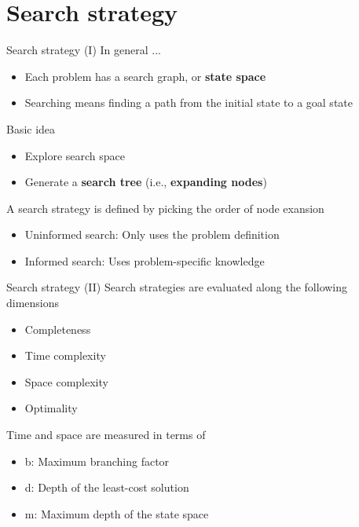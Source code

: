 \documentclass[10pt,compress]{beamer} %
\begin{document}
\section{Search strategy}

\begin{frame}{Search strategy (I)}
    In general ...
	    \begin{itemize}
    	    \item Each problem has a search graph, or \textbf{state space}
        	\item Searching means finding a path from the initial state to a goal state
    	\end{itemize}

    Basic idea
        \begin{itemize}
            \item Explore search space
            \item Generate a \textbf{search tree} (i.e., \textbf{expanding nodes})
        \end{itemize}

    A search strategy is defined by picking the order of node exansion
        \begin{itemize}
            \item Uninformed search: Only uses the problem definition
            \item Informed search: Uses problem-specific knowledge
        \end{itemize}
\end{frame}

\begin{frame}{Search strategy (II)}
    Search strategies are evaluated along the following dimensions
	    \begin{itemize}
    	    \item Completeness
        	\item Time complexity
            \item Space complexity
            \item Optimality
    	\end{itemize}

    Time and space are measured in terms of 
        \begin{itemize}
            \item b: Maximum branching factor
            \item d: Depth of the least-cost solution
            \item m: Maximum depth of the state space
        \end{itemize}
\end{frame}
\end{document}
